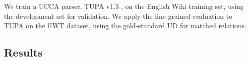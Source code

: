 \documentclass[11pt,a4paper]{article}
\begin{document}
We train a UCCA parser,
TUPA v1.3 \cite{hershcovich2017a,hershcovich2018multitask},
on the English Wiki training set, using the development set for validation.
We apply the fine-grained evaluation to TUPA on the EWT dataset,
using the gold-standard UD for matched relations.


%


%

%

\subsection{Results}\label{sec:results}
\end{document}
